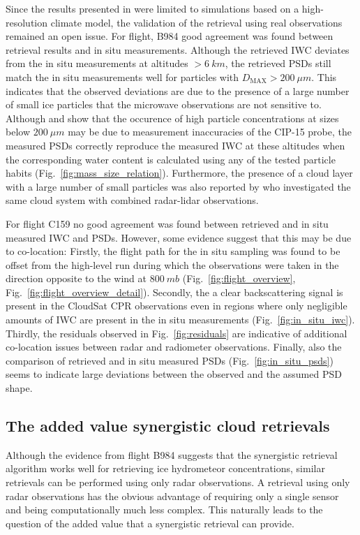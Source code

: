 \documentclass[journal abbreviation, manuscript]{copernicus}
\begin{document}
Since the results presented in \citet{pfreundschuh20} were limited to
simulations based on a high-resolution climate model, the validation of the
retrieval using real observations remained an open issue. For flight, B984 good
agreement was found between retrieval results and in situ measurements. Although
the retrieved IWC deviates from the in situ measurements at altitudes $>
6\ \unit{km}$, the retrieved PSDs still match the in situ measurements well for
particles with $D_\text{MAX} > 200\ \unit{\mu m}$. This indicates that the
observed deviations are due to the presence of a large number of small ice
particles that the microwave observations are not sensitive to. Although
\citet{oshea21} and \citet{oshea19} show that the occurence of high particle
concentrations at sizes below $200\ \unit{\mu m}$ may be due to measurement
inaccuracies of the CIP-15 probe, the measured PSDs correctly reproduce the
measured IWC at these altitudes when the corresponding water content is
calculated using any of the tested particle habits
(Fig.~\ref{fig:mass_size_relation}). Furthermore, the presence of a cloud layer
with a large number of small particles was also reported by \citet{ewald21} who
investigated the same cloud system with combined radar-lidar observations.

For flight C159 no good agreement was found between retrieved and in situ
measured IWC and PSDs. However, some evidence suggest that this may be due to
co-location: Firstly, the flight path for the in situ sampling was found to be
offset from the high-level run during which the observations were taken in the
direction opposite to the wind at $800\ \unit{mb}$
(Fig.~\ref{fig:flight_overview}, Fig.~\ref{fig:flight_overview_detail}).
Secondly, the a clear backscattering signal is present in the CloudSat CPR
observations even in regions where only negligible amounts of IWC are present in
the in situ measurements (Fig.~\ref{fig:in_situ_iwc}). Thirdly, the residuals
observed in Fig.~\ref{fig:residuals} are indicative of additional co-location
issues between radar and radiometer observations. Finally, also the
comparison of retrieved and in situ measured PSDs (Fig.~\ref{fig:in_situ_psds})
seems to indicate large deviations between the observed and the assumed PSD
shape.

\subsection{The added value synergistic cloud retrievals}

Although the evidence from flight B984 suggests that the synergistic
retrieval algorithm works well for retrieving ice hydrometeor concentrations,
similar retrievals can be performed using only radar observations. A retrieval
using only radar observations has the obvious advantage of requiring only
a single sensor and being computationally much less complex. This naturally
leads to the question of the added value that a synergistic retrieval
can provide.
\end{document}
